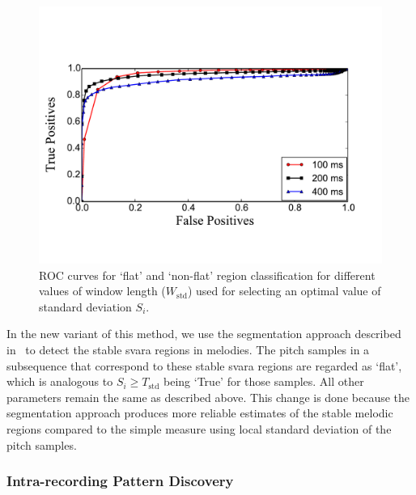 \begin{figure}
	\begin{center}
		\includegraphics[width=\figSizeEightyFive]{ch06_patterns/figures/discovery/ROCFlatness.pdf}
	\end{center}
	\caption{ROC curves for `flat' and `non-flat' region classification for different values of window length ($W_{\text{std}}$) used for selecting an optimal value of standard deviation $S_i$.}
	\label{fig:ROC_pattern_discovery}
\end{figure}

In the new variant of this method, we use the segmentation approach described in~ to detect the stable \gls{svara} regions in melodies. The pitch samples in a subsequence that correspond to these stable \gls{svara} regions are regarded as `flat', which is analogous to $S_i\geq T_{\text{std}}$ being `True' for those samples. All other parameters remain the same as described above. This change is done because the segmentation approach produces more reliable estimates of the stable melodic regions compared to the simple measure using local standard deviation of the pitch samples. 


\subsubsection{Intra-recording Pattern Discovery}
\label{sec:intraRecordingPatternDiscovery}

